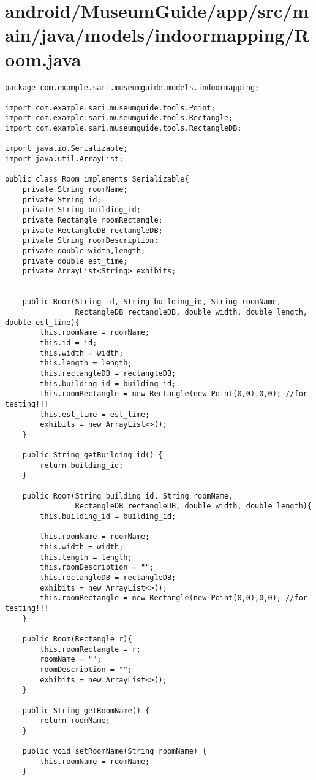 \section{android/MuseumGuide/app/src/main/java/models/indoormapping/Room.java}
\begin{lstlisting}package com.example.sari.museumguide.models.indoormapping;

import com.example.sari.museumguide.tools.Point;
import com.example.sari.museumguide.tools.Rectangle;
import com.example.sari.museumguide.tools.RectangleDB;

import java.io.Serializable;
import java.util.ArrayList;

public class Room implements Serializable{
    private String roomName;
    private String id;
    private String building_id;
    private Rectangle roomRectangle;
    private RectangleDB rectangleDB;
    private String roomDescription;
    private double width,length;
    private double est_time;
    private ArrayList<String> exhibits;


    public Room(String id, String building_id, String roomName,
                RectangleDB rectangleDB, double width, double length, double est_time){
        this.roomName = roomName;
        this.id = id;
        this.width = width;
        this.length = length;
        this.rectangleDB = rectangleDB;
        this.building_id = building_id;
        this.roomRectangle = new Rectangle(new Point(0,0),0,0); //for testing!!!
        this.est_time = est_time;
        exhibits = new ArrayList<>();
    }

    public String getBuilding_id() {
        return building_id;
    }

    public Room(String building_id, String roomName,
                RectangleDB rectangleDB, double width, double length){
        this.building_id = building_id;

        this.roomName = roomName;
        this.width = width;
        this.length = length;
        this.roomDescription = "";
        this.rectangleDB = rectangleDB;
        exhibits = new ArrayList<>();
        this.roomRectangle = new Rectangle(new Point(0,0),0,0); //for testing!!!
    }

    public Room(Rectangle r){
        this.roomRectangle = r;
        roomName = "";
        roomDescription = "";
        exhibits = new ArrayList<>();
    }

    public String getRoomName() {
        return roomName;
    }

    public void setRoomName(String roomName) {
        this.roomName = roomName;
    }


\end{lstlisting}
